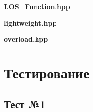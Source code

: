 \documentclass[12pt,a4paper]{article}
\begin{document}
\begin{myquote}
    \begin{center}
        \textbf{LOS\_Function.hpp}
    \end{center}
\end{myquote}

\begin{myquote}
    \begin{center}
        \textbf{lightweight.hpp}
    \end{center}
\end{myquote}

\begin{myquote}
    \begin{center}
        \textbf{overload.hpp}
    \end{center}
\end{myquote}

\section{Тестирование}

\subsection*{Тест №1}
\end{document}
